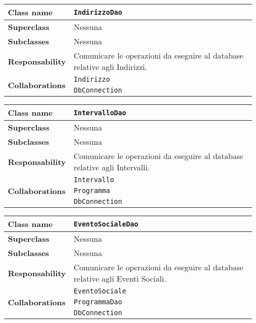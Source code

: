 \begin{table}[h!]
	\begin{tabular}{|l|l|}
		\hline 
		\textbf{Class name} & \texttt{IndirizzoDao}
		\\ \hline
		\textbf{Superclass} & Nessuna
		\\ \hline
		\multirow{1}{*}{\textbf{Subclasses}} & Nessuna
		\\ \hline
		\textbf{Responsability} & Comunicare le operazioni da eseguire al database relative agli Indirizzi.
		\\ \hline
		\multirow{2}{*}{\textbf{Collaborations}} & \texttt{Indirizzo} \\ 
		& \texttt{DbConnection} \\
	\hline
	\end{tabular}
\end{table}	


\begin{table}[h!]
	\begin{tabular}{|l|l|}
		\hline 
		\textbf{Class name} & \texttt{IntervalloDao}
		\\ \hline
		\textbf{Superclass} & Nessuna
		\\ \hline
		\multirow{1}{*}{\textbf{Subclasses}} & Nessuna
		\\ \hline
		\textbf{Responsability} & Comunicare le operazioni da eseguire al database relative agli Intervalli.
		\\ \hline
		\multirow{3}{*}{\textbf{Collaborations}} & \texttt{Intervallo} \\ 
		& \texttt{Programma} \\
		& \texttt{DbConnection} \\ \hline
	\end{tabular}
\end{table}

\begin{table}[h!]
	\begin{tabular}{|l|l|}
		\hline 
		\textbf{Class name} & \texttt{EventoSocialeDao}
		\\ \hline
		\textbf{Superclass} & Nessuna
		\\ \hline
		\multirow{1}{*}{\textbf{Subclasses}} & Nessuna
		\\ \hline
		\textbf{Responsability} & Comunicare le operazioni da eseguire al database relative agli Eventi Sociali.
		\\ \hline
		\multirow{3}{*}{\textbf{Collaborations}} & \texttt{EventoSociale }\\ 
		& \texttt{ProgrammaDao} \\
		& \texttt{DbConnection} \\ \hline
	\end{tabular}
\end{table}

